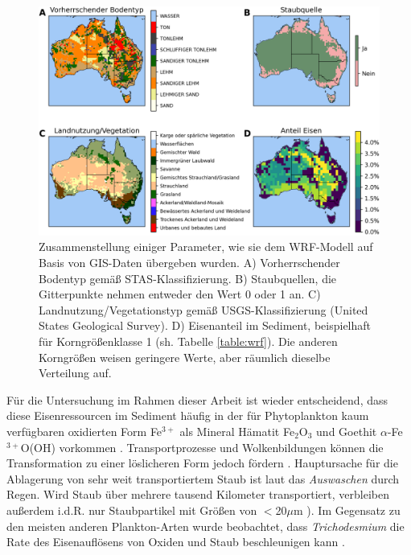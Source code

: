 \documentclass[12pt,a4paper,onecolumn,headheight=30pt]{scrartcl}
\begin{document}
\begin{figure}[htbp]
\includegraphics[width=\textwidth]{bilder/soil_type_iron.png}
\caption{Zusammenstellung einiger Parameter, wie sie dem WRF-Modell auf Basis von GIS-Daten übergeben wurden. A) Vorherrschender Bodentyp gemäß STAS-Klassifizierung. B) Staubquellen, die Gitterpunkte nehmen entweder den Wert 0 oder 1 an. C) Landnutzung/Vegetationstyp gemäß USGS-Klassifizierung (United States Geological Survey). D) Eisenanteil im Sediment, beispielhaft für Korngrößenklasse 1 (sh. Tabelle \ref{table:wrf}). Die anderen Korngrößen weisen geringere Werte, aber räumlich dieselbe Verteilung auf.} \label{fig:soil_type_iron}
\end{figure}
Für die Untersuchung im Rahmen dieser Arbeit ist wieder entscheidend, dass diese Eisenressourcen im Sediment häufig in der für Phytoplankton kaum verfügbaren oxidierten Form Fe$^{3+}$ als Mineral Hämatit Fe$_2$O$_3$ und Goethit $\alpha$-Fe$^{3+}$O(OH) vorkommen \citep{Reynolds.2014}. Transportprozesse und Wolkenbildungen können die Transformation zu einer löslicheren Form jedoch fördern \citep{Shao.2011}. Hauptursache für die Ablagerung von sehr weit transportiertem Staub ist laut \citet{Marx.2018} das \textit{Auswaschen} durch Regen. Wird Staub über mehrere tausend Kilometer transportiert, verbleiben außerdem  i.d.R. nur Staubpartikel mit Größen von $<$20$\mu$m \citep{Marx.2018}). Im Gegensatz zu den meisten anderen Plankton-Arten wurde beobachtet, dass \textit{Trichodesmium} die Rate des Eisenauflösens von Oxiden und Staub beschleunigen kann \citep{Rubin.2011}.
\end{document}
